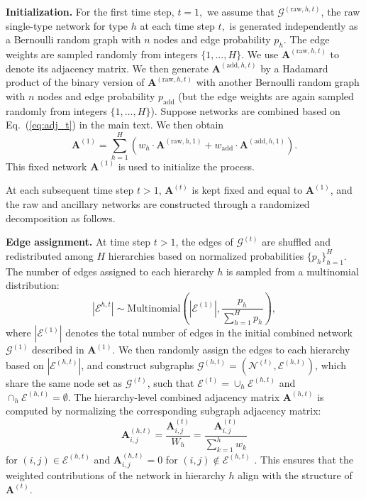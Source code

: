 \documentclass{article}
\theoremstyle{plain}
\theoremstyle{definition}
\theoremstyle{remark}
\begin{document}
\textbf{Initialization.} For the first time step, $t=1,$  we assume that $\mathcal{G}^{(\text{raw}, h,t)}$, the raw single-type network for type $h$ at each time step $t,$ is generated independently as a Bernoulli random graph with $n$ nodes and edge probability $p_h$. The edge weights are sampled randomly from integers $\{1, \dots, H\}$. We use $\mathbf{A}^{(\text{raw}, h,t)}$ to denote its adjacency matrix. We then generate $\mathbf{A}^{(\text{add}, h,t)}$ by a Hadamard product of the binary version of $\mathbf{A}^{(\text{raw}, h,t)}$ with another Bernoulli random graph with $n$ nodes and edge probability $p_\text{add}$ (but the edge weights are again sampled randomly from integers $\{1, \dots, H\}$). Suppose networks are combined based on Eq.~(\ref{eq:adj_t}) in the main text. We then obtain
$$
\mathbf{A}^{(1)} = \sum_{h=1}^{H} \left( w_h \cdot \mathbf{A}^{(\text{raw}, h, 1)} + w_{\text{add}} \cdot \mathbf{A}^{(\text{add}, h, 1)} \right).$$
This fixed network $\mathbf{A}^{(1)}$ is used to initialize the process. 

At each subsequent time step $t > 1$, $\mathbf{A}^{(t)}$ is kept fixed and equal to $\mathbf{A}^{(1)}$, and the raw and ancillary networks are constructed through a randomized decomposition as follows.

\textbf{Edge assignment.} At time step $t > 1$, the edges of $\mathcal{G}^{(t)}$ are shuffled and redistributed among $H$ hierarchies based on normalized probabilities $\{p_h\}_{h=1}^H$. The number of edges assigned to each hierarchy $h$ is sampled from a multinomial distribution:
$$
\left\lvert\mathcal{E}^{h,t}\right\rvert \sim \text{Multinomial}\left(\left\lvert\mathcal{E}^{(1)}\right\rvert, \frac{p_h}{\sum_{h=1}^{H} p_h}\right),$$ where $\left\lvert\mathcal{E}^{(1)}\right\rvert$ denotes the total number of edges in the initial combined network $\mathcal{G}^{(1)}$ described in $\mathbf{A}^{(1)}.$ We then randomly assign the edges to each hierarchy based on $\left\lvert\mathcal{E}^{(h,t)}\right\rvert$, and construct subgraphs $\mathcal{G}^{(h,t)}=(\mathcal{N}^{(t)}, \mathcal{E}^{(h,t)})$, which share the same node set as $\mathcal{G}^{(t)}$, such that $\mathcal{E}^{(t)}=\cup_h\mathcal{E}^{(h,t)}$ and $\cap_h\mathcal{E}^{(h,t)}=\emptyset.$
The hierarchy-level combined adjacency matrix $\mathbf{A}^{(h,t)}$ is computed by normalizing the corresponding subgraph adjacency matrix:
$$
\mathbf{A}^{(h,t)}_{i,j} = \frac{\mathbf{A}^{(t)}_{i,j}}{W_h}= \frac{\mathbf{A}^{(t)}_{i,j}}{\sum_{k=1}^{h} w_k}
$$ for $(i,j)\in\mathcal{E}^{(h,t)}$ and $\mathbf{A}^{(h,t)}_{i,j} =0$ for $(i,j)\notin\mathcal{E}^{(h,t)}$ . 
This ensures that the weighted contributions of the network in hierarchy $h$ align with the structure of $\mathbf{A}^{(t)}$.
\end{document}
